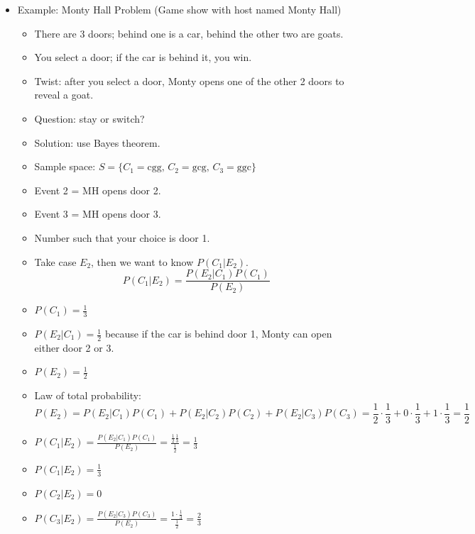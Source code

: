 \begin{itemize}
      \item Example: Monty Hall Problem (Game show with host named Monty Hall)
            \begin{itemize}
                  \item There are 3 doors; behind one is a car, behind the other two are goats.
                  \item You select a door; if the car is behind it, you win.
                  \item Twist: after you select a door, Monty opens one of the other 2 doors to reveal a goat.
                  \item Question: stay or switch?
                  \item Solution: use Bayes theorem.
                  \item Sample space: $S = \{ C_1 = \text{cgg},\, C_2 = \text{gcg},\, C_3 = \text{ggc} \}$
                  \item Event 2 = MH opens door 2.
                  \item Event 3 = MH opens door 3.
                  \item Number such that your choice is door 1.
                  \item Take case $E_2$, then we want to know $P(C_1|E_2)$.
                        \[ P(C_1 | E_2) = \frac{P(E_2 | C_1) P(C_1)}{P(E_2)} \]
                  \item $P(C_1)= \frac{1}{3}$
                  \item $P(E_2 | C_1) = \frac{1}{2}$ because if the car is behind door 1, Monty can open either door 2 or 3.
                  \item $P(E_2) = \frac{1}{2}$
                  \item Law of total probability:
                        \[ P(E_2) = P(E_2 | C_1) P(C_1) + P(E_2 | C_2) P(C_2) + P(E_2 | C_3) P(C_3)  = \frac{1}{2} \cdot \frac{1}{3} + 0 \cdot \frac{1}{3} + 1 \cdot \frac{1}{3} = \frac{1}{2} \]
                  \item $P(C_1 | E_2) = \frac{P(E_2 | C_1) P(C_1)}{P(E_2)} = \frac{\frac{1}{2} \frac{1}{3}}{\frac{1}{2}} = \frac{1}{3}$
                  \item $P(C_1 | E_2) = \frac{1}{3}$
                  \item $P(C_2 |E_2) = 0$
                  \item $P(C_3 |E_2) = \frac{P(E_2 | C_3) P(C_3)}{P(E_2)} = \frac{1 \cdot \frac{1}{3}}{\frac{1}{2}} = \frac{2}{3}$
            \end{itemize}
\end{itemize}

